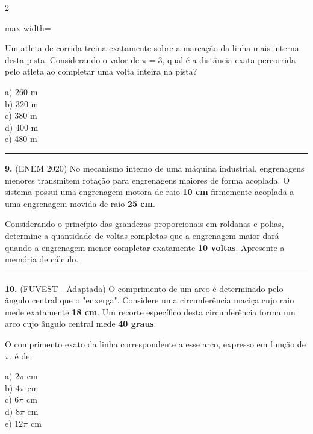 \documentclass[11pt, a4paper]{article}
\begin{document}
\begin{multicols*}{2}
\begin{center}
\begin{adjustbox}{max width=\linewidth}
\end{adjustbox}
\end{center}

Um atleta de corrida treina exatamente sobre a marcação da linha mais interna desta pista. Considerando o valor de $\pi = 3$, qual é a distância exata percorrida pelo atleta ao completar uma volta inteira na pista?

a) 260 m\\[0.3cm]
b) 320 m\\[0.3cm]
c) 380 m\\[0.3cm]
d) 400 m\\[0.3cm]
e) 480 m\\[0.3cm]

\vspace{0.4cm}
\noindent\textcolor{CorLinha}{\rule{\linewidth}{0.5pt}} 
\vspace{0.2cm}

\textbf{9.} (ENEM 2020) No mecanismo interno de uma máquina industrial, engrenagens menores transmitem rotação para engrenagens maiores de forma acoplada. O sistema possui uma engrenagem motora de raio \textbf{10 cm} firmemente acoplada a uma engrenagem movida de raio \textbf{25 cm}. 

Considerando o princípio das grandezas proporcionais em roldanas e polias, determine a quantidade de voltas completas que a engrenagem maior dará quando a engrenagem menor completar exatamente \textbf{10 voltas}. Apresente a memória de cálculo.

\vspace{2.5cm}

\vspace{0.4cm}
\noindent\textcolor{CorLinha}{\rule{\linewidth}{0.5pt}} 
\vspace{0.2cm}

\textbf{10.} (FUVEST - Adaptada) O comprimento de um arco é determinado pelo ângulo central que o "enxerga". Considere uma circunferência maciça cujo raio mede exatamente \textbf{18 cm}. Um recorte específico desta circunferência forma um arco cujo ângulo central mede \textbf{40 graus}. 

O comprimento exato da linha correspondente a esse arco, expresso em função de $\pi$, é de:

a) $2\pi$ cm\\[0.3cm]
b) $4\pi$ cm\\[0.3cm]
c) $6\pi$ cm\\[0.3cm]
d) $8\pi$ cm\\[0.3cm]
e) $12\pi$ cm\\[0.3cm]

\end{multicols*}
\end{document}
